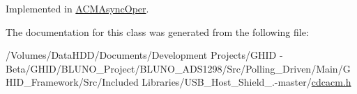 \-Implemented in \hyperlink{class_a_c_m_async_oper_af3e9315952212775f90eb3ccfff168c8}{\-A\-C\-M\-Async\-Oper}.



\-The documentation for this class was generated from the following file\-:\begin{DoxyCompactItemize}
\item 
/\-Volumes/\-Data\-H\-D\-D/\-Documents/\-Development Projects/\-G\-H\-I\-D -\/ Beta/\-G\-H\-I\-D/\-B\-L\-U\-N\-O\-\_\-\-Project/\-B\-L\-U\-N\-O\-\_\-\-A\-D\-S1298/\-Src/\-Polling\-\_\-\-Driven/\-Main/\-G\-H\-I\-D\-\_\-\-Framework/\-Src/\-Included Libraries/\-U\-S\-B\-\_\-\-Host\-\_\-\-Shield\-\_.-\/master/\hyperlink{cdcacm_8h}{cdcacm.\-h}\end{DoxyCompactItemize}

